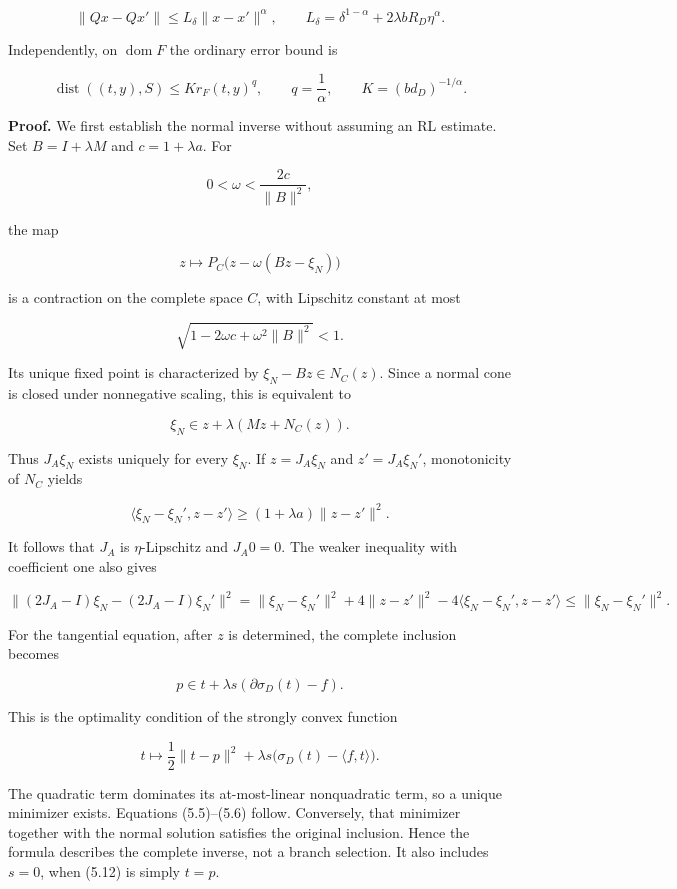 \documentclass[11pt,a4paper]{article}
\theoremstyle{plain}
\theoremstyle{definition}
\theoremstyle{remark}
\begin{document}
\[
\|Qx-Qx'\|\le L_\delta\|x-x'\|^\alpha,
\qquad
L_\delta=\delta^{1-\alpha}+2\lambda bR_D\eta^\alpha.
\tag{5.7}
\]

Independently, on \(\operatorname{dom}F\) the ordinary error bound is

\[
\operatorname{dist}((t,y),S)
\le K r_F(t,y)^q,
\qquad
q=\frac1\alpha,\qquad K=(bd_D)^{-1/\alpha}.
\tag{5.8}
\]

\textbf{Proof.} We first establish the normal inverse without assuming
an RL estimate. Set \(B=I+\lambda M\) and \(c=1+\lambda a\). For

\[
0<\omega<\frac{2c}{\|B\|^2},
\]

the map

\[
z\longmapsto P_C\bigl(z-\omega(Bz-\xi_N)\bigr)
\]

is a contraction on the complete space \(C\), with Lipschitz constant at
most

\[
\sqrt{1-2\omega c+\omega^2\|B\|^2}<1.
\]

Its unique fixed point is characterized by \(\xi_N-Bz\in N_C(z)\). Since
a normal cone is closed under nonnegative scaling, this is equivalent to

\[
\xi_N\in z+\lambda(Mz+N_C(z)).
\tag{5.9}
\]

Thus \(J_A\xi_N\) exists uniquely for every \(\xi_N\). If \(z=J_A\xi_N\)
and \(z'=J_A\xi_N'\), monotonicity of \(N_C\) yields

\[
\langle \xi_N-\xi_N',z-z'\rangle
\ge(1+\lambda a)\|z-z'\|^2.
\tag{5.10}
\]

It follows that \(J_A\) is \(\eta\)-Lipschitz and \(J_A0=0\). The weaker
inequality with coefficient one also gives

\[
\|(2J_A-I)\xi_N-(2J_A-I)\xi_N'\|^2
=\|\xi_N-\xi_N'\|^2+4\|z-z'\|^2
-4\langle \xi_N-\xi_N',z-z'\rangle
\le\|\xi_N-\xi_N'\|^2.
\tag{5.11}
\]

For the tangential equation, after \(z\) is determined, the complete
inclusion becomes

\[
p\in t+\lambda s(\partial\sigma_D(t)-f).
\tag{5.12}
\]

This is the optimality condition of the strongly convex function

\[
t\longmapsto\frac12\|t-p\|^2+
\lambda s\bigl(\sigma_D(t)-\langle f,t\rangle\bigr).
\]

The quadratic term dominates its at-most-linear nonquadratic term, so a
unique minimizer exists. Equations (5.5)--(5.6) follow. Conversely, that
minimizer together with the normal solution satisfies the original
inclusion. Hence the formula describes the complete inverse, not a
branch selection. It also includes \(s=0\), when (5.12) is simply
\(t=p\).
\end{document}
